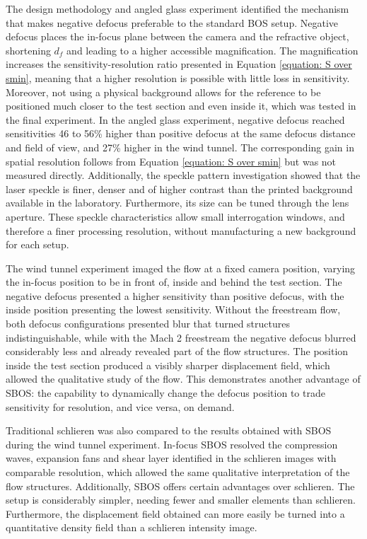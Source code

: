 The design methodology and angled glass experiment identified the mechanism that makes negative defocus preferable to the standard BOS setup. Negative defocus places the in-focus plane between the camera and the refractive object, shortening $d_f$ and leading to a higher accessible magnification. The magnification increases the sensitivity-resolution ratio presented in Equation \ref{equation: S over smin}, meaning that a higher resolution is possible with little loss in sensitivity. Moreover, not using a physical background allows for the reference to be positioned much closer to the test section and even inside it, which was tested in the final experiment. In the angled glass experiment, negative defocus reached sensitivities 46 to 56\% higher than positive defocus at the same defocus distance and field of view, and 27\% higher in the wind tunnel. The corresponding gain in spatial resolution follows from Equation \ref{equation: S over smin} but was not measured directly. Additionally, the speckle pattern investigation showed that the laser speckle is finer, denser and of higher contrast than the printed background available in the laboratory. Furthermore, its size can be tuned through the lens aperture. These speckle characteristics allow small interrogation windows, and therefore a finer processing resolution, without manufacturing a new background for each setup.

The wind tunnel experiment imaged the flow at a fixed camera position, varying the in-focus position to be in front of, inside and behind the test section. The negative defocus presented a higher sensitivity than positive defocus, with the inside position presenting the lowest sensitivity. Without the freestream flow, both defocus configurations presented blur that turned structures indistinguishable, while with the Mach 2 freestream the negative defocus blurred considerably less and already revealed part of the flow structures. The position inside the test section produced a visibly sharper displacement field, which allowed the qualitative study of the flow. This demonstrates another advantage of SBOS: the capability to dynamically change the defocus position to trade sensitivity for resolution, and vice versa, on demand.

Traditional schlieren was also compared to the results obtained with SBOS during the wind tunnel experiment. In-focus SBOS resolved the compression waves, expansion fans and shear layer identified in the schlieren images with comparable resolution, which allowed the same qualitative interpretation of the flow structures. Additionally, SBOS offers certain advantages over schlieren. The setup is considerably simpler, needing fewer and smaller elements than schlieren. Furthermore, the displacement field obtained can more easily be turned into a quantitative density field than a schlieren intensity image.


